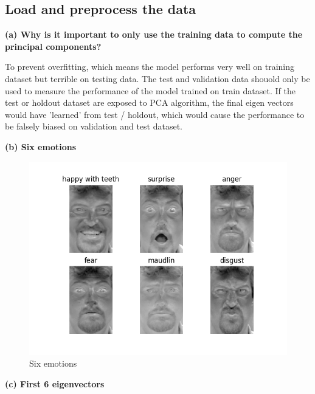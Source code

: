 \documentclass{article} %
\begin{document}
\subsection{Load and preprocess the data}

\textbf{(a) Why is it important to only use the training data to compute the principal components?}

To prevent overfitting, which means the model performs very well on training dataset but terrible on testing data. The test and validation data shouold only be used to measure the performance of the model trained on train dataset. 
If the test or holdout dataset are exposed to PCA algorithm, the final eigen vectors would have 'learned' from test / holdout, which would cause the performance 
to be falsely biased on validation and test dataset.

\textbf{(b) Six emotions}

\begin{figure}[htb]
    \includegraphics[width=\textwidth]{./Images/six-emotions.png}
    \caption{Six emotions}
    \label{Six emotions}
\end{figure}

\textbf{(c) First 6 eigenvectors}
\end{document}
